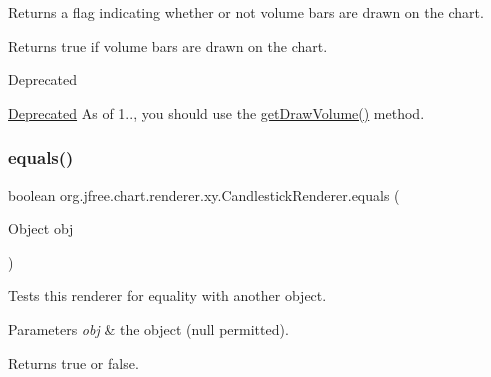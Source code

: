 Returns a flag indicating whether or not volume bars are drawn on the chart.

\begin{DoxyReturn}{Returns}
{\ttfamily true} if volume bars are drawn on the chart.
\end{DoxyReturn}
\begin{DoxyRefDesc}{Deprecated}
\item[\mbox{\hyperlink{deprecated__deprecated000205}{Deprecated}}]As of 1.., you should use the \mbox{\hyperlink{classorg_1_1jfree_1_1chart_1_1renderer_1_1xy_1_1_candlestick_renderer_a031b1f856f7ef71b3ec51e52604c9dfe}{get\+Draw\+Volume()}} method. \end{DoxyRefDesc}
\mbox{\label{classorg_1_1jfree_1_1chart_1_1renderer_1_1xy_1_1_candlestick_renderer_a485c75b3f10761630e5f1cec14097517}} 
\subsubsection{\texorpdfstring{equals()}{equals()}}
{\footnotesize\ttfamily boolean org.\+jfree.\+chart.\+renderer.\+xy.\+Candlestick\+Renderer.\+equals (\begin{DoxyParamCaption}\item[{Object}]{obj }\end{DoxyParamCaption})}

Tests this renderer for equality with another object.


\begin{DoxyParams}{Parameters}
{\em obj} & the object ({\ttfamily null} permitted).\\
\hline
\end{DoxyParams}
\begin{DoxyReturn}{Returns}
{\ttfamily true} or {\ttfamily false}. 
\end{DoxyReturn}
\mbox{\label{classorg_1_1jfree_1_1chart_1_1renderer_1_1xy_1_1_candlestick_renderer_a474f9a432d60cbdd154642ed9f13f659}} 
